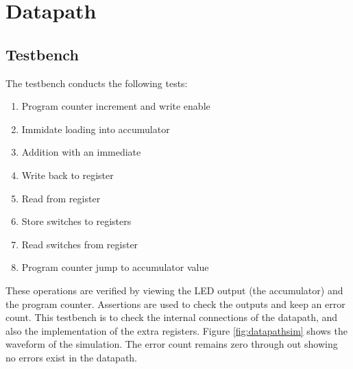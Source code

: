 


\section{Datapath}
\subsection{Testbench}
The testbench conducts the following tests:
\begin{enumerate}
\item Program counter increment and write enable
\item Immidate loading into accumulator
\item Addition with an immediate
\item Write back to register
\item Read from register
\item Store switches to registers
\item Read switches from register
\item Program counter jump to accumulator value
\end{enumerate}

These operations are verified by viewing the LED output (the accumulator) and the program counter.
Assertions are used to check the outputs and keep an error count. 
This testbench is to check the internal connections of the datapath, and also the implementation of the extra registers.
Figure \ref{fig:datapathsim} shows the waveform of the simulation. 
The error count remains zero through out showing no errors exist in the datapath.

